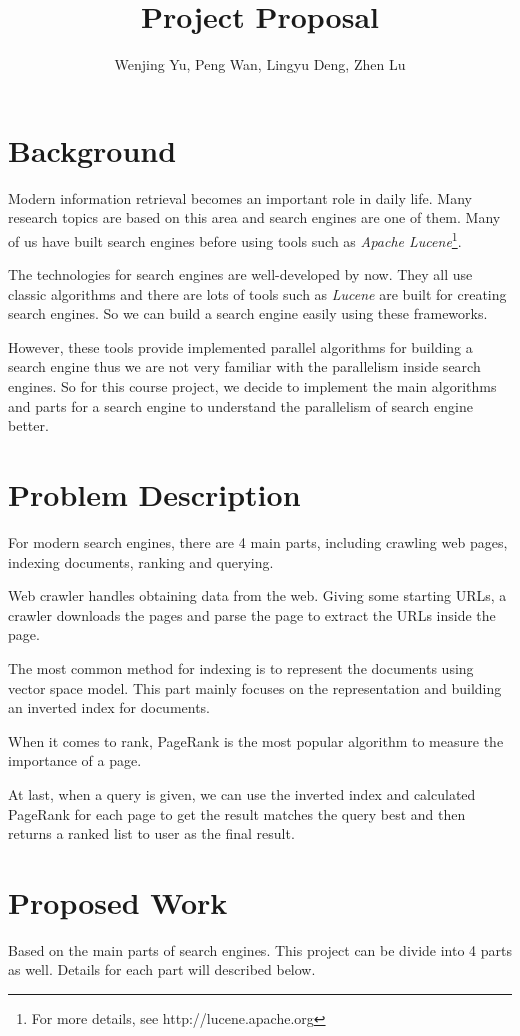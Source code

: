 \documentclass[11pt]{amsart}
\title{Project Proposal}
\author{Wenjing Yu, Peng Wan, Lingyu Deng, Zhen Lu}
\begin{document}
\maketitle
\section{Background}
Modern information retrieval becomes an important role in daily life. Many research topics
are based on this area and search engines are one of them. Many of us have built search engines 
before using tools such as \emph{Apache Lucene}\footnote{For more details, see 
http://lucene.apache.org}. 

The technologies for search engines are well-developed by now. They all use classic algorithms and
there are lots of tools such as \emph{Lucene} are built for creating search engines. So we can
build a search engine easily using these frameworks.

However, these tools provide implemented parallel algorithms for building a search engine thus we are
not very familiar with the parallelism inside search engines. So for this course project, we 
decide to implement the main algorithms and parts for a search engine to understand the parallelism 
of search engine better.

\section{Problem Description}
For modern search engines, there are 4 main parts, including crawling web pages, indexing documents, 
ranking and querying. 

Web crawler handles obtaining data from the web. Giving some starting URLs, a crawler downloads the
pages and parse the page to extract the URLs inside the page. 

The most common method for indexing is to represent the documents using vector space model. This part
mainly focuses on the representation and building an inverted index for documents.

When it comes to rank, PageRank is the most popular algorithm to measure the importance of a page. 

At last, when a query is given, we can use the inverted index and calculated PageRank for each page
to get the result matches the query best and then returns a ranked list to user as the final result.

\section{Proposed Work}
Based on the main parts of search engines. This project can be divide into 4 parts as well. Details
for each part will described below.
\end{document}
